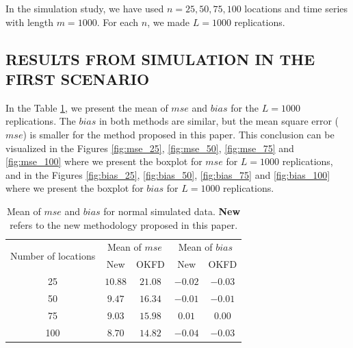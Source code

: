 \documentclass[
  12pt,
]{article}
\theoremstyle{definition}
\theoremstyle{definition}
\theoremstyle{definition}
\theoremstyle{remark}
\begin{document}
In the simulation study, we have used \(n=25,50,75,100\) locations and time series with length \(m=1000\). For each \(n\), we made \(L=1000\) replications.

\hypertarget{results-from-simulation-in-the-first-scenario}{%
\subsection*{RESULTS FROM SIMULATION IN THE FIRST SCENARIO}\label{results-from-simulation-in-the-first-scenario}}

In the Table \ref{tab:summary-normal}, we present the mean of \(mse\) and \(bias\) for the \(L=1000\) replications. The \(bias\) in both methods are similar, but the mean square error (\(mse\)) is smaller for the method proposed in this paper. This conclusion can be visualized in the Figures \ref{fig:mse_25}, \ref{fig:mse_50}, \ref{fig:mse_75} and \ref{fig:mse_100} where we present the boxplot for \(mse\) for \(L=1000\) replications, and in the Figures \ref{fig:bias_25}, \ref{fig:bias_50}, \ref{fig:bias_75} and \ref{fig:bias_100} where we present the boxplot for \(bias\) for \(L=1000\) replications.

\begin{table}[htbp]
 \centering
 \caption{Mean of $mse$ and $bias$ for normal simulated data. \textbf{New} refers to the new methodology proposed in this paper.}
 \label{tab:summary-normal}
  \begin{tabular}{ccc|cc}
  \toprule
   \multirow{2}{*}{Number of locations}& \multicolumn{2}{c|}{Mean of $mse$} & \multicolumn{2}{|c}{Mean of $bias$}\\ \cmidrule{2-5}
    & New & OKFD & New & OKFD \\ \midrule
    25 & $10.88$ & $21.08$ & $-0.02$ & $-0.03$\\
    50 & $9.47$ & $16.34$ & $-0.01$ & $-0.01$\\
    75 & $9.03$ & $15.98$ & $0.01$ & $0.00$\\
    100 & $8.70$ & $14.82$ & $-0.04$ & $-0.03$\\ \bottomrule
  \end{tabular}
\end{table}
\end{document}
